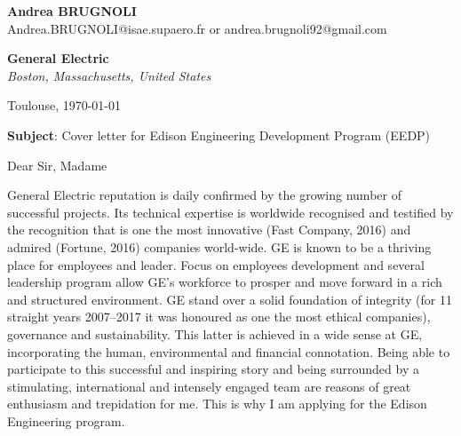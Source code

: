 \documentclass[11pt]{letter}
\begin{document}
 \begin{flushleft}
 {\bfseries Andrea \textsc{BRUGNOLI}}\\[.35ex]
 Andrea.BRUGNOLI@isae.supaero.fr or andrea.brugnoli92@gmail.com
 \end{flushleft}
 \begin{flushright}
 {\bfseries General Electric}\\[.35ex]
 \small\itshape
  Boston, Massachusetts, United States
  \end{flushright}
 \begin{flushright}
 Toulouse, \today 
 \end{flushright}
 \textbf{Subject}: Cover letter for Edison Engineering Development Program (EEDP)

 Dear Sir, Madame

General Electric reputation is daily confirmed by the growing number of successful projects. Its technical expertise is worldwide recognised and testified by the recognition that is one the most innovative (Fast Company, 2016) and admired (Fortune, 2016) companies world-wide. GE is known to be a thriving place for employees and leader. Focus on employees development and several leadership program allow GE's workforce to prosper and move forward in a rich and structured environment. GE stand over a solid foundation of integrity (for 11 straight years 2007–2017 it was honoured as one the most ethical companies), governance and sustainability. This latter is achieved in a wide sense at GE, incorporating the human, environmental and financial connotation.     Being able to participate to this successful and inspiring story and being surrounded by a stimulating, international and intensely engaged team are reasons of great enthusiasm and trepidation for me. This is why I am applying for the Edison Engineering program. 
\end{document}
